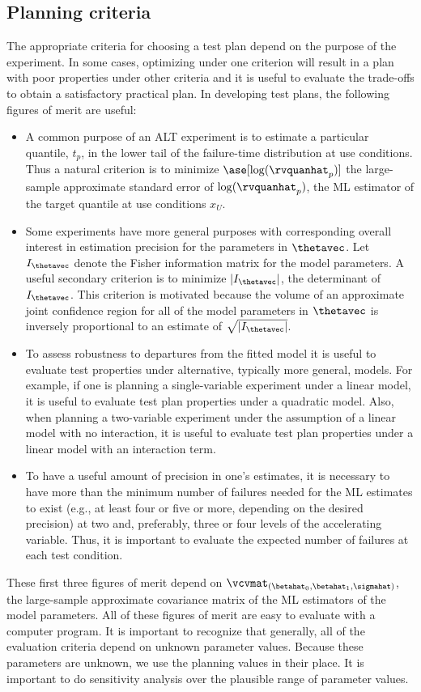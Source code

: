 \subsection{Planning criteria}

The appropriate criteria for choosing a test plan depend on the
purpose of the experiment.   In some cases, optimizing under one
criterion will result in a plan with poor properties under other
criteria and it is useful to evaluate the trade-offs to obtain a
satisfactory practical plan.  In developing test plans, the following
figures of merit are useful:
\begin{itemize}
\item
A common purpose of an ALT experiment is to estimate a particular
quantile, $t_{p}$, in the lower tail of the failure-time distribution at
use conditions. Thus a natural criterion is to minimize
$\ase[\log(\rvquanhat_{p})]$ the
large-sample approximate standard error of $\log(\rvquanhat_{p})$, the ML
estimator of the target quantile at use conditions $x_{U}$.
\item
Some experiments have more general purposes with corresponding overall 
interest in estimation precision for the parameters in $\thetavec$.  Let
$I_{\thetavec}$ denote the Fisher information matrix for the model
parameters.  A useful secondary criterion is to minimize
$|I_{\thetavec}|$, the
determinant of $I_{\thetavec}$.  This criterion is motivated because
the volume of an approximate joint confidence region for all of the model
parameters in $\thetavec$ is inversely proportional to an estimate of
$\sqrt{|I_{\thetavec}|}$.
\item
To assess robustness to departures from the fitted model it
is useful to evaluate test properties under alternative, typically
more general, models.  For example, if one is planning a single-variable
experiment under a linear model, it is useful to evaluate test plan
properties under a quadratic model. Also, when planning a two-variable
experiment under the assumption of a linear model with no interaction,
it is useful to evaluate test plan properties under a linear model
with an interaction term.
\item
To have a useful amount of precision in one's estimates, it is
necessary to have more than the minimum number of failures needed
for the ML estimates to exist (e.g., at least four or five or more,
depending on the desired precision) at two and, preferably, three or
four levels of the accelerating variable. Thus, it is important to
evaluate the expected number of failures at each test condition.
\end{itemize}
These first three figures of merit depend on
$\vcvmat_{(\betahat_{0},\betahat_{1},\sigmahat)}$, the large-sample
approximate covariance matrix of the ML estimators of the model
parameters.  All of these figures of merit are easy to evaluate
with a computer program. It is important to recognize that generally, all of 
the evaluation criteria depend on unknown parameter values.
Because these parameters are unknown, we use the planning values 
in their place. It is important to do sensitivity
analysis over the plausible range of parameter values.


